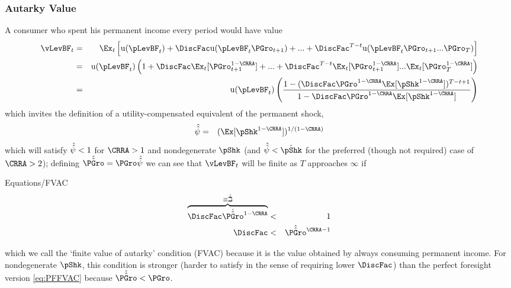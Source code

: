 \documentclass[titlepage]{\econtex}\providecommand{\texname}{BufferStockTheory}%
\providecommand{\EqDir}{Equations}
\begin{document}
\subsubsection{Autarky Value}
A consumer who spent his permanent income every period would have
value
\begin{eqnarray*}
      \vLevBF_{t} & = & \Ex_{t}\left[\util(\pLevBF_{t}) + \DiscFac \util(\pLevBF_{t}\PGro_{t+1}) + ... + \DiscFac^{T-t}\util(\pLevBF_{t}\PGro_{t+1}...\PGro_{T})\right] \\
%
      & = & \util(\pLevBF_{t})\left(1+ \DiscFac \Ex_{t}[\PGro_{t+1}^{1-\CRRA}] +  ... + \DiscFac^{T-t}\Ex_{t}[\PGro_{t+1}^{1-\CRRA}]...\Ex_{t}[\PGro_{T}^{1-\CRRA}]\right) \\
%
      & = & \util(\pLevBF_{t})\left(\frac{1-(\DiscFac \PGro^{1-\CRRA}\Ex[\pShk^{1-\CRRA}])^{T-t+1}}{1-\DiscFac \PGro^{1-\CRRA} \Ex[\pShk^{1-\CRRA}]}\right)
      \end{eqnarray*}
which invites the definition of a utility-compensated equivalent of the permanent shock,
\begin{eqnarray*}
  \uInvEpShkuInv & = & (\Ex[\pShk^{1-\CRRA}])^{1/(1-\CRRA)}
\end{eqnarray*}
which will satisfy $\hat{\hat{\psi}} < 1$ for $\CRRA>1$ and nondegenerate $\pShk$ (and $\uInvEpShkuInv < \InvEpShkInv$ for the preferred (though not required) case of $\CRRA > 2$); defining $\PGrouAdj=\PGro \uInvEpShkuInv$ we can see that $\vLevBF_{t}$ will be finite as $T$ approaches $\infty$ if

\hypertarget{FVAC}{}
\begin{verbatimwrite}{\EqDir/FVAC}
\begin{eqnarray}
\overbrace{\DiscFac \PGrouAdj^{1-\CRRA} }^{\equiv \DiscAltuAdj} & < & 1 \label{eq:FVAC}
\\ \DiscFac & < & \PGrouAdj^{\CRRA-1} \notag
\end{eqnarray}
\end{verbatimwrite}
 which we call the `finite value of autarky'
condition (FVAC) because it is the value obtained by always consuming
permanent income.  For nondegenerate $\pShk$, this condition is stronger
(harder to satisfy in the sense of requiring lower $\DiscFac$) than
the perfect foresight version \eqref{eq:PFFVAC} because $\PGrouAdj <
\PGro$.
\begin{comment}
A useful alternative version is
\begin{verbatimwrite}{\EqDir/FVACAlt}
\begin{eqnarray}
    \DiscFac \Rfree \PGro^{-\CRRA} \uInvEpShkuInv^{1-\CRRA}  & < & \Rfree/\PGro \nonumber
%
\\ \PatPGro \uInvEpShkuInv^{1/\CRRA-1} & < & (\Rfree/\PGro)^{1/\CRRA} \label{eq:FVACAlt}.
\end{eqnarray}
\end{verbatimwrite}

\end{comment}
\end{document}

